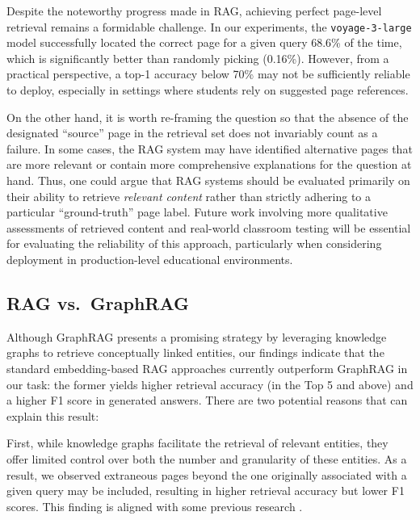 \documentclass[runningheads]{llncs}
\begin{document}
Despite the noteworthy progress made in RAG, achieving perfect page-level retrieval remains a formidable challenge. In our experiments, the \texttt{voyage-3-large} model successfully located the correct page for a given query 68.6\% of the time, which is significantly better than randomly picking (0.16\%). However, from a practical perspective, a top-1 accuracy below 70\% may not be sufficiently reliable to deploy, especially in settings where students rely on suggested page references.

On the other hand, it is worth re-framing the question so that the absence of the designated ``source'' page in the retrieval set does not invariably count as a failure. In some cases, the RAG system may have identified alternative pages that are more relevant or contain more comprehensive explanations for the question at hand. Thus, one could argue that RAG systems should be evaluated primarily on their ability to retrieve \emph{relevant content} rather than strictly adhering to a particular ``ground-truth'' page label. Future work involving more qualitative assessments of retrieved content and real-world classroom testing will be essential for evaluating the reliability of this approach, particularly when considering deployment in production-level educational environments.


\subsection{RAG vs.\ GraphRAG} \label{subsec:rag_vs_graphrag}

Although GraphRAG presents a promising strategy by leveraging knowledge graphs to retrieve conceptually linked entities, our findings indicate that the standard embedding-based RAG approaches currently outperform GraphRAG in our task: the former yields higher retrieval accuracy (in the Top 5 and above) and a higher F1 score in generated answers. There are two potential reasons that can explain this result:

First, while knowledge graphs facilitate the retrieval of relevant entities, they offer limited control over both the number and granularity of these entities. As a result, we observed extraneous pages beyond the one originally associated with a given query may be included, resulting in higher retrieval accuracy but lower F1 scores. This finding is aligned with some previous research \cite{he2024g,zhang2025survey,guo2024graphrag}.
\end{document}
